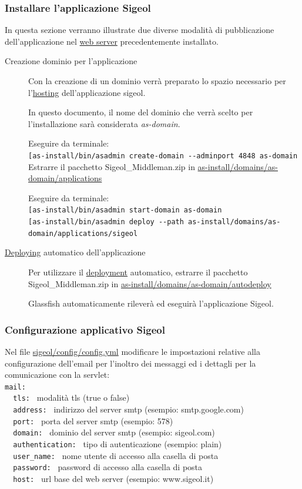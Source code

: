 \documentclass[11pt,a4paper]{article}
\begin{document}
\subsubsection{Installare l'applicazione Sigeol}
In questa sezione verranno illustrate due diverse modalità di pubblicazione dell'applicazione nel \underline{web server} precedentemente installato.
\begin{description}
 \item[Creazione dominio per l'applicazione] 
Con la creazione di un dominio verrà preparato lo spazio necessario per l'\underline{hosting} dell'applicazione sigeol.

In questo documento, il nome del dominio che verrà scelto per l'installazione sarà considerata \textit{as-domain}.

Eseguire da terminale:\\
\verb|[as-install/bin/asadmin create-domain --adminport 4848 as-domain|
Estrarre il pacchetto Sigeol\_Middleman.zip in \url{as-install/domains/as-domain/applications} 

Eseguire da terminale:\\
\verb|[as-install/bin/asadmin start-domain as-domain|\\
\verb|[as-install/bin/asadmin deploy --path as-install/domains/as-domain/applications/sigeol|

\item[\underline{Deploying} automatico dell'applicazione]
Per utilizzare il \underline{deployment} automatico, estrarre il pacchetto Sigeol\_Middleman.zip  in \url{as-install/domains/as-domain/autodeploy} 

Glassfish automaticamente rileverà ed eseguirà l'applicazione Sigeol.
\end{description}

\subsubsection{Configurazione applicativo Sigeol}

Nel file \url{sigeol/config/config.yml} modificare le impostazioni relative alla configurazione dell'email per l'inoltro dei messaggi ed i dettagli per la comunicazione con la servlet:\\
\verb|mail:|\\
\verb|  tls: | modalità tls (true o false)\\
\verb|  address: | indirizzo del server smtp (esempio: smtp.google.com)\\
\verb|  port: | porta del server smtp (esempio: 578)\\
\verb|  domain: | dominio del server smtp (esempio: sigeol.com)\\
\verb|  authentication: | tipo di autenticazione (esempio: plain)\\
\verb|  user_name: | nome utente di accesso alla casella di posta\\
\verb|  password: | password di accesso alla casella di posta\\
\verb|  host: | url base del web server (esempio: www.sigeol.it)\\
\end{document}
